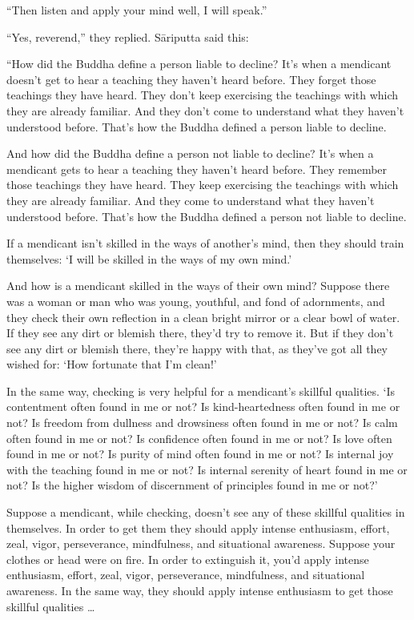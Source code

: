 \documentclass[12pt,openany]{book}%
\begin{document}
“Then listen and apply your mind well, I will speak.” 

“Yes, reverend,” they replied. \textsanskrit{Sāriputta} said this: 

“How did the Buddha define a person liable to decline? It’s when a mendicant doesn’t get to hear a teaching they haven’t heard before. They forget those teachings they have heard. They don’t keep exercising the teachings with which they are already familiar. And they don’t come to understand what they haven’t understood before. That’s how the Buddha defined a person liable to decline. 

And how did the Buddha define a person not liable to decline? It’s when a mendicant gets to hear a teaching they haven’t heard before. They remember those teachings they have heard. They keep exercising the teachings with which they are already familiar. And they come to understand what they haven’t understood before. That’s how the Buddha defined a person not liable to decline. 

If a mendicant isn’t skilled in the ways of another’s mind, then they should train themselves: ‘I will be skilled in the ways of my own mind.’ 

And how is a mendicant skilled in the ways of their own mind? Suppose there was a woman or man who was young, youthful, and fond of adornments, and they check their own reflection in a clean bright mirror or a clear bowl of water. If they see any dirt or blemish there, they’d try to remove it. But if they don’t see any dirt or blemish there, they’re happy with that, as they’ve got all they wished for: ‘How fortunate that I’m clean!’ 

In the same way, checking is very helpful for a mendicant’s skillful qualities. ‘Is contentment often found in me or not? Is kind-heartedness often found in me or not? Is freedom from dullness and drowsiness often found in me or not? Is calm often found in me or not? Is confidence often found in me or not? Is love often found in me or not? Is purity of mind often found in me or not? Is internal joy with the teaching found in me or not? Is internal serenity of heart found in me or not? Is the higher wisdom of discernment of principles found in me or not?’ 

Suppose a mendicant, while checking, doesn’t see any of these skillful qualities in themselves. In order to get them they should apply intense enthusiasm, effort, zeal, vigor, perseverance, mindfulness, and situational awareness. Suppose your clothes or head were on fire. In order to extinguish it, you’d apply intense enthusiasm, effort, zeal, vigor, perseverance, mindfulness, and situational awareness. In the same way, they should apply intense enthusiasm to get those skillful qualities … 
\end{document}
